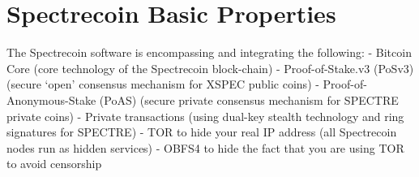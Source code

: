 \chapter{Spectrecoin Basic Properties}
The Spectrecoin software is encompassing and integrating the following: 
- Bitcoin Core (core technology of the Spectrecoin block-chain) 
- Proof-of-Stake.v3 (PoSv3) (secure ‘open’ consensus mechanism for XSPEC public coins) 
- Proof-of-Anonymous-Stake (PoAS) (secure private consensus mechanism for SPECTRE private coins) 
- Private transactions (using dual-key stealth technology and ring signatures for SPECTRE) 
- TOR to hide your real IP address (all Spectrecoin nodes run as hidden services) 
- OBFS4 to hide the fact that you are using TOR to avoid censorship
